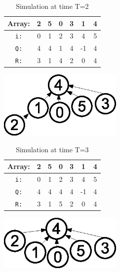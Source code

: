 \documentclass[twoside]{article}
\begin{document}
\begin{table}[H]
    \begin{minipage}[H]{.5\textwidth }
        \footnotesize
        \begin{tabular}{ |c|c|c|c|c|c|c| } 
 \hline
 \textbf{Array:} & 2 & 5 & 0 & 3 & 1 & 4 \\
 \hline
 \texttt{i:} & 0 & 1 & 2 & 3 & 4 & 5 \\ 
 \texttt{Q:} & 4 & 4 & 1 & 4 & -1 & 4 \\ 
 \texttt{R:} & 3 & 1 & 4 & 2 & 0 & 4 \\ 
 \hline
        \end{tabular}
        \caption{Simulation at time T=2}
    \end{minipage}%
    \begin{minipage}[H]{.5\textwidth}
        \includegraphics[width=0.45\textwidth, scale=0.5]{img/iter_2.eps}
    \end{minipage}
\end{table}

\begin{table}[H]
    \begin{minipage}[H]{.5\textwidth }
        \footnotesize
        \begin{tabular}{ |c|c|c|c|c|c|c| } 
 \hline
 \textbf{Array:} & 2 & 5 & 0 & 3 & 1 & 4 \\
 \hline
 \texttt{i:} & 0 & 1 & 2 & 3 & 4 & 5 \\ 
 \texttt{Q:} & 4 & 4 & 4 & 4 & -1 & 4 \\ 
 \texttt{R:} & 3 & 1 & 5 & 2 & 0 & 4 \\ 
 \hline
        \end{tabular}
        \caption{Simulation at time T=3}
    \end{minipage}%
    \begin{minipage}[H]{.5\textwidth}
        \includegraphics[width=0.45\textwidth, scale=0.5]{img/iter_3.eps}
    \end{minipage}
\end{table}
\end{document}
